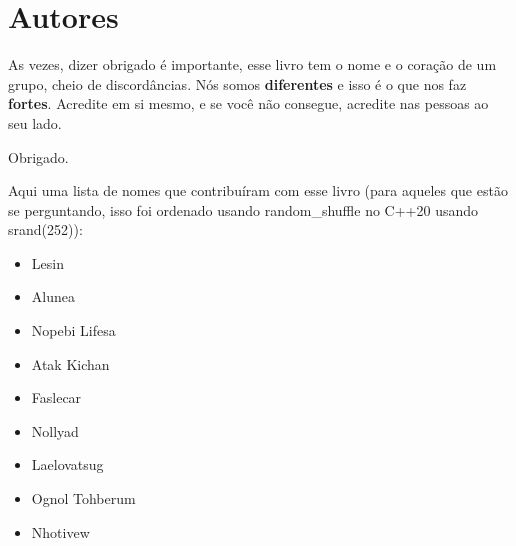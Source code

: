     \section{Autores}

    As vezes, dizer obrigado é importante, esse livro tem o nome e o coração de um grupo, cheio de discordâncias. Nós somos \textbf{diferentes} e isso é o que nos faz \textbf{fortes}. Acredite em si mesmo, e se você não consegue, acredite nas pessoas ao seu lado.

    Obrigado.

    Aqui uma lista de nomes que contribuíram com esse livro (para aqueles que estão se perguntando, isso foi ordenado usando random\_shuffle no C++20 usando srand(252)):
    \begin{itemize}
        \item Lesin
        \item Alunea
        \item Nopebi Lifesa
        \item Atak Kichan
        \item Faslecar
        \item Nollyad
        \item Laelovatsug
        \item Ognol Tohberum
        \item Nhotivew
    \end{itemize}
